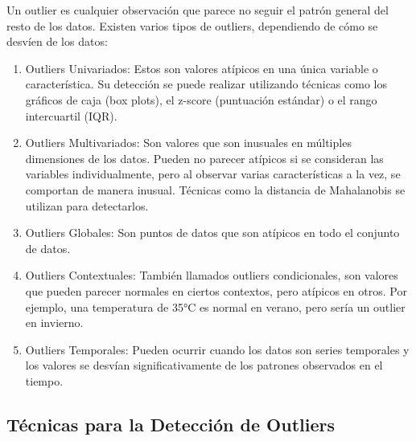 \documentclass[
  us-letterpaper,
]{scrreprt}
\theoremstyle{plain}
\theoremstyle{plain}
\theoremstyle{definition}
\theoremstyle{remark}
\begin{document}
Un outlier es cualquier observación que parece no seguir el patrón
general del resto de los datos. Existen varios tipos de outliers,
dependiendo de cómo se desvíen de los datos:

\begin{enumerate}
\def\labelenumi{\arabic{enumi}.}
\item
  Outliers Univariados: Estos son valores atípicos en una única variable
  o característica. Su detección se puede realizar utilizando técnicas
  como los gráficos de caja (box plots), el z-score (puntuación
  estándar) o el rango intercuartil (IQR).
\item
  Outliers Multivariados: Son valores que son inusuales en múltiples
  dimensiones de los datos. Pueden no parecer atípicos si se consideran
  las variables individualmente, pero al observar varias características
  a la vez, se comportan de manera inusual. Técnicas como la distancia
  de Mahalanobis se utilizan para detectarlos.
\item
  Outliers Globales: Son puntos de datos que son atípicos en todo el
  conjunto de datos.
\item
  Outliers Contextuales: También llamados outliers condicionales, son
  valores que pueden parecer normales en ciertos contextos, pero
  atípicos en otros. Por ejemplo, una temperatura de 35°C es normal en
  verano, pero sería un outlier en invierno.
\item
  Outliers Temporales: Pueden ocurrir cuando los datos son series
  temporales y los valores se desvían significativamente de los patrones
  observados en el tiempo.
\end{enumerate}

\subsection{Técnicas para la Detección de
Outliers}\label{tuxe9cnicas-para-la-detecciuxf3n-de-outliers}
\end{document}
